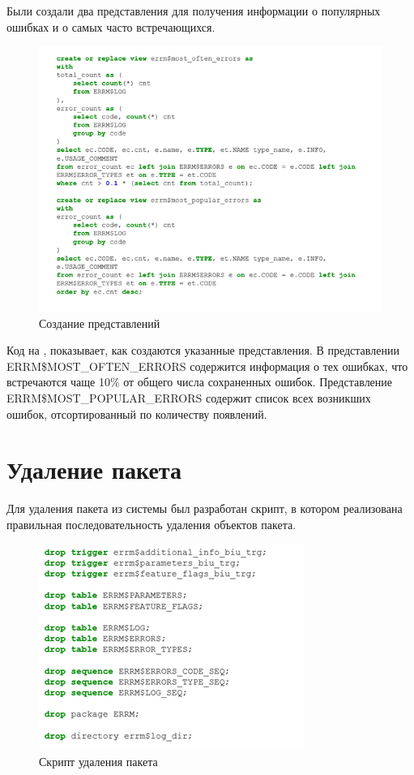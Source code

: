Были создали два представления для получения информации о популярных ошибках и о самых часто встречающихся. 

\begin{figure}[ht!] 
	\center
	\includegraphics [scale=1] {my_folder/img/c3_view_code.png}
	\caption{Создание представлений} 
	\label{fig:c3_view_code}  
\end{figure}
\FloatBarrier

Код на , показывает, как создаются указанные представления. 
В представлении ERRM\$MOST\_OFTEN\_ERRORS содержится информация о тех ошибках, что встречаются чаще 10\% от общего числа сохраненных ошибок. 
Представление ERRM\$MOST\_POPULAR\_ERRORS содержит список всех возникших ошибок, отсортированный по количеству появлений. 


\section{Удаление пакета} \label{ch3:sec10}

Для удаления пакета из системы был разработан скрипт, в котором реализована правильная последовательность удаления объектов пакета. 

\begin{figure}[ht!] 
	\center
	\includegraphics [scale=1] {my_folder/img/c3_uninstall.png}
	\caption{Скрипт удаления пакета} 
	\label{fig:c3_uninstall}  
\end{figure}
\FloatBarrier

